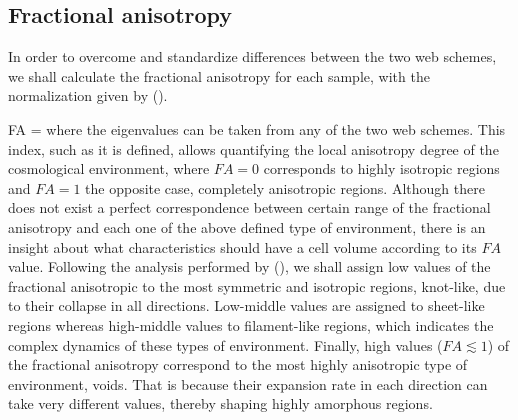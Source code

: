 \documentclass[usenatbib]{latex/mn2e}
\begin{document}
\subsection{Fractional anisotropy}
\label{subsec:fractional_anisotropy}



In order to overcome and standardize differences between the two web 
schemes, we shall calculate the fractional anisotropy for each sample, 
with the normalization given by ().



{ FA =  }
where the eigenvalues can be taken from any of the two web schemes. This 
index, such as it is defined, allows quantifying the local anisotropy 
degree of the cosmological environment, where $FA=0$ corresponds to highly
isotropic regions and $FA=1$ the opposite case, completely anisotropic 
regions. Although there does not exist a perfect correspondence between 
certain range of the fractional anisotropy and each one of the above defined
type of environment, there is an insight about what characteristics should 
have a cell volume according to its $FA$ value. Following the analysis 
performed by (), we shall assign low values of the 
fractional anisotropic to the most symmetric and isotropic regions, 
knot-like, due to their collapse in all directions. Low-middle values are 
assigned to sheet-like regions whereas high-middle values to filament-like 
regions, which indicates the complex dynamics of these types of environment. 
Finally, high values ($FA \lesssim 1$) of the fractional anisotropy 
correspond to the most highly anisotropic type of environment, voids. That
is because their expansion rate in each direction can take very different 
values, thereby shaping highly amorphous regions.
\end{document}
